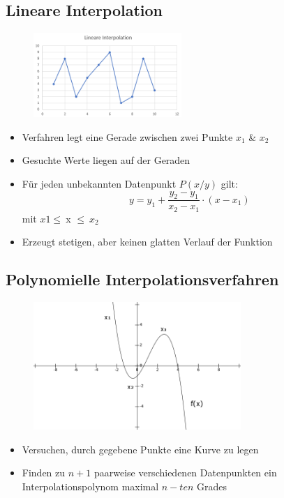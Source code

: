 \subsection{Lineare Interpolation}
\begin{frame}{\insertsubsectionhead}
\begin{figure}
  \centering
     \includegraphics[width=0.5\textwidth]{pics/linear.png}
  \label{fig:Bild1}
\end{figure}
\begin{itemize}
\item Verfahren legt eine Gerade zwischen zwei Punkte $x_1$ \& $x_2$
\item Gesuchte Werte liegen auf der Geraden
\item Für jeden unbekannten Datenpunkt $P(x/y)$ gilt:
$$y = y_1 + \frac{y_2 - y_1}{x_2 - x_1} \cdot (x - x_1)$$
mit $x1\leq\ $x $\leq \ x_2$
\item Erzeugt stetigen, aber keinen glatten Verlauf der Funktion
\end{itemize}
\end{frame}

\subsection{Polynomielle Interpolationsverfahren}
\begin{frame}{\insertsubsectionhead}
\begin{figure}
  \centering
     \includegraphics[width=0.7\textwidth]{pics/polynoms.png}
  \label{fig:Bild1}
\end{figure}
\begin{itemize}
\item Versuchen, durch gegebene Punkte eine Kurve zu legen
\item Finden zu $n+1$ paarweise verschiedenen Datenpunkten ein Interpolationspolynom maximal $n-ten$ Grades
\end{itemize}
\end{frame}

